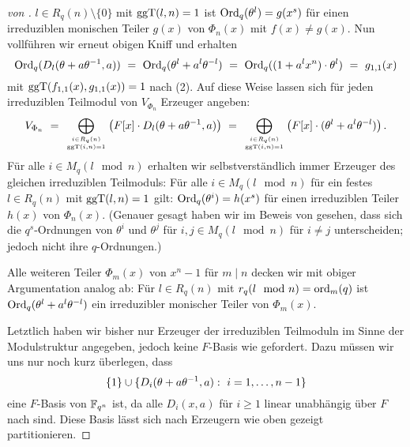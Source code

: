 \begin{proof}[von ]
  $l \in R_q(n)\setminus \{ 0\}$ mit $\operatorname{ggT}(l,n) = 1$ ist
  $\operatorname{Ord}_q(\theta^l) = g(x^s)$ für einen irreduziblen monischen Teiler 
  $g(x)$ von $\Phi_n(x)$ mit $f(x) \neq g(x)$. 
  Nun vollführen wir erneut obigen Kniff und erhalten 
  \[ \operatorname{Ord}_q(D_l(\theta+a\theta^{-1},a)) \ =\ 
    \operatorname{Ord}_q(\theta^l+a^l\theta^{-l}) \ =\  
    \operatorname{Ord}_q( (1+a^lx^n)\cdot \theta^l ) \ =\  g_{1,1}(x)\]
  mit $\operatorname{ggT}(f_{1,1}(x), g_{1,1}(x)) = 1$ nach  (2).
  Auf diese Weise lassen sich für jeden irreduziblen Teilmodul von 
  $V_{\Phi_n}$ Erzeuger angeben:
  \[ V_{\Phi_n} \ =\  \bigoplus_{i\in R_q(n)\atop \operatorname{ggT}(i,n)=1} 
    \big( F[x] \cdot D_l(\theta+a\theta^{-1},a)\big) \ =\ 
    \bigoplus_{i\in R_q(n)\atop \operatorname{ggT}(i,n)=1} 
    \big( F[x]\cdot (\theta^l+a^l\theta^{-l}) \big)\,. \]
  Für alle $i \in M_q(l\mod n)$ erhalten wir 
  selbstverständlich immer Erzeuger des
  gleichen irreduziblen Teilmoduls: Für alle 
  $i\in M_q(l\mod n)$ für ein festes $l\in R_q(n)$ mit 
  $\operatorname{ggT}(l,n)=1$ gilt: $\operatorname{Ord}_q(\theta^i) = h(x^s)$ für einen
  irreduziblen Teiler $h(x)$ von $\Phi_n(x)$. (Genauer gesagt haben wir 
  im Beweis von  gesehen,
  dass sich die $q^s$-Ordnungen von $\theta^i$ und $\theta^j$ für 
  $i,j \in M_q(l\mod n)$ für $i\neq j$ unterscheiden; jedoch nicht ihre
  $q$-Ordnungen.) 

  Alle weiteren Teiler $\Phi_m(x)$ von $x^n-1$ für $m\mid n$ decken wir mit
  obiger Argumentation analog ab: Für $l \in R_q(n)$ mit 
  $r_q(l\mod n) = \operatorname{ord}_m(q)$ ist 
  $\operatorname{Ord}_q(\theta^l+a^l\theta^{-l})$ ein irreduzibler monischer Teiler
  von $\Phi_m(x)$.

  Letztlich haben wir bisher nur Erzeuger der irreduziblen Teilmoduln 
  im Sinne der Modulstruktur angegeben, jedoch keine $F$-Basis wie gefordert.
  Dazu müssen wir uns nur noch kurz überlegen, dass
  \[\{1\}\cup \{ D_i(\theta+a\theta\inv,a):\ i=1,\ldots,n-1\} \]
  eine $F$-Basis von $\mathbb{F}_{q^n}$ ist, da alle $D_i(x,a)$ für
  $i\geq 1$ linear unabhängig über $F$ nach 
   sind. Diese Basis lässt sich nach 
  Erzeugern wie oben gezeigt partitionieren.
\end{proof}



